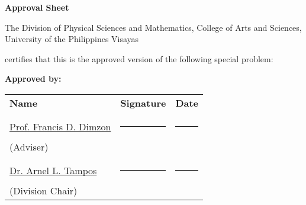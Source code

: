 \begin{center}
	\textbf{Approval Sheet}
		
	The Division of Physical Sciences and Mathematics, College of Arts and Sciences, University of the Philippines Visayas 
	
	certifies that this is the approved version of the following special problem:
	
	\end{center}
	
	{\small\textbf{Approved by:}}
	
	\newcommand{\signaturerule}{\rule{10em}{.4pt}}
		\begin{tabular}{lll}
			\bfseries Name  & \bfseries Signature & \bfseries Date\\ \\
			\underline{Prof. Francis D. Dimzon} &\signaturerule  & \signaturerule\\ 
			(Adviser)\\ \\
			\underline{Dr. Arnel L. Tampos}  &\signaturerule &\signaturerule\\
			(Division Chair)
	
		\end{tabular}